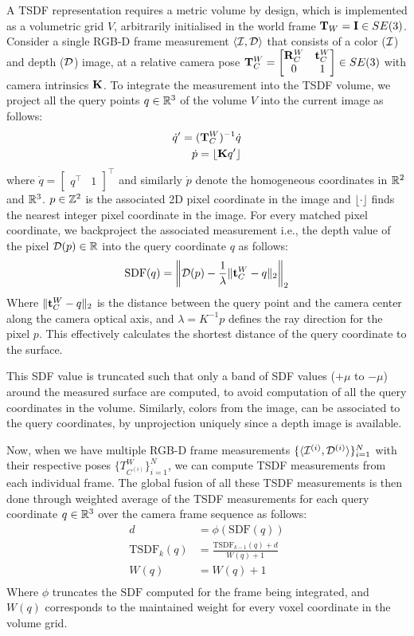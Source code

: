 A TSDF representation requires a metric volume by design, which is implemented as a volumetric grid $V$, arbitrarily initialised in the world frame $\mathbf{T}_W = \mathbf{I} \in SE(3)$. Consider a single RGB-D frame measurement $\langle \mathcal{I}, \mathcal{D} \rangle$ that consists of a color ($\mathcal{I}$) and depth ($\mathcal{D}$) image, at a relative camera pose $\mathbf{T}_C^W  = \begin{bmatrix}
    \mathbf{R}_C^W & \mathbf{t}_C^W \\ 0 & 1
\end{bmatrix}\in SE(3)$ with camera intrinsics $\mathbf{K}$. To integrate the measurement into the TSDF volume, we project  all the query points $q \in \mathbb{R}^3$ of the volume $V$ into the current image as follows:
\begin{align*}
    \dot{q}^\prime = (\mathbf{T}_C^W)^{-1} \dot{q} \\
    \dot{p} = \lfloor \mathbf{K} q^\prime\rfloor
\end{align*}
where $\dot{q} = \begin{bmatrix}
    q^\top & 1
\end{bmatrix}^\top$  and similarly $\dot{p}$ denote the homogeneous coordinates in $\mathbb{R}^2$ and $\mathbb{R}^3$. $p \in \mathbb{Z}^2$ is the associated 2D pixel coordinate in the image and $\lfloor \cdot \rfloor$ finds the nearest integer pixel coordinate in the image. For every matched pixel coordinate, we backproject the associated measurement i.e., the depth value of the pixel $\mathcal{D}(p) \in \mathbb{R}$ into the query coordinate $q$ as follows:
\begin{align*}
    \text{SDF}(q) =  \left\lVert \mathcal{D}(p) - \frac{1}{\lambda} \|\mathbf{t}_C^W - q\|_2 \right\rVert_2
\end{align*}
Where $\| \mathbf{t}_C^W - q \|_2$ is the distance between the query point and the camera center along the camera optical axis, and $\lambda = K^{-1} p$ defines the ray direction for the pixel $p$. This effectively calculates the shortest distance of the query coordinate to the surface.

This SDF value is truncated such that only a band of SDF values ($+\mu$ to $-\mu$) around the measured surface are computed, to avoid computation of all the query coordinates in the volume.
Similarly, colors from the image, can be associated to the query coordinates, by unprojection uniquely since a depth image is available.

Now, when we have multiple RGB-D frame measurements $\{\langle \mathcal{I}^{(i)}, \mathcal{D}^{(i)} \rangle\}_{i=1}^{N}$ with their respective poses $\{ T_{C^{(i)}}^W \}_{i=1}^N$, we can compute TSDF measurements from each individual frame. The global fusion of all these TSDF measurements is then done through weighted average of the TSDF measurements for each query coordinate $q \in \mathbb{R}^3$ over the camera frame sequence as follows:
\begin{align*}
    d &= \phi(\text{SDF}(q)) \\
    \text{TSDF}_k(q) &= \frac{\text{TSDF}_{k-1}(q) + d}{W(q) + 1} \\
    W(q) &= W(q) + 1 \\
\end{align*}
Where $\phi$ truncates the $\text{SDF}$ computed for the frame being integrated, and $W(q)$ corresponds to the maintained weight for every voxel coordinate in the volume grid.

